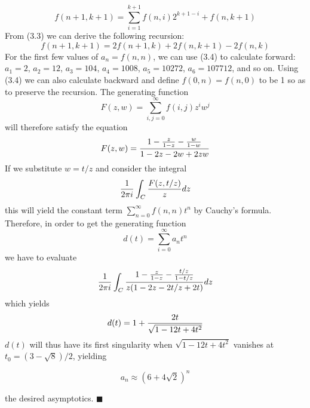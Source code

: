 \addtocounter{equation}{0}
\begin{equation}
f(n+1,k+1) = \sum_{i=1}^{k+1} f(n,i)2^{k+1-i} + f(n,k+1)
\end{equation}
From (3.3) we can derive the following recursion: 
\begin{equation}
f(n+1,k+1) = 2f(n+1,k) + 2f(n,k+1) -2f(n,k)
\end{equation}
For the first few values of $a_n = f(n,n)$, we can use (3.4) to calculate
forward: $a_1 =2$, $a_2 =12$, $a_3=104$, $a_4=1008$, $a_5=10272$,
$a_6=107712$, and so on.  Using (3.4) we can also calculate backward
and define $f(0,n)=f(n,0)$ to be 1 so as to preserve the recursion.
The generating function
\begin{equation}
F(z,w) = \sum_{i,j=0}^{\infty} f(i,j)z^iw^j
\end{equation}
will therefore satisfy the equation
\begin{equation}
F(z,w) = {{1 -{z \over 1-z} -{w \over 1-w}}\over{1-2z-2w+2zw}}
\end{equation}
If we substitute $w=t/z$ and consider the integral
\begin{equation}
{1\over{2 \pi i}} \int_{C}{F(z,t/z)\over z}dz
\end{equation}
this will yield the constant term $ \sum_{n=0}^{\infty} f(n,n)t^n$ by
Cauchy's formula. Therefore, in order to get the generating function
\begin{equation}
d(t) = \sum_{i=0}^{\infty} a_n t^n
\end{equation}
we have to evaluate
\begin{equation}
{1\over {2 \pi i}} \int_{C}{{1 -{z \over {1-z}} -{t/z \over 1-{t/z}}}\over
z{(1-2z-2{t/z}+2t)}}dz
\end{equation}
which yields
\begin{equation}
d(t) = 1 + {2t \over \sqrt{1-12t+4t^2}}
\end{equation}
$d(t)$ will thus have its first singularity when $ \sqrt{1-12t+4t^2}$
vanishes at $t_0=(3-\sqrt{8})/2$, yielding 

\begin{equation}
a_n \approx (6+4 \sqrt{2})^n
\end{equation}

\noindent
the desired asymptotics. $\blacksquare$

